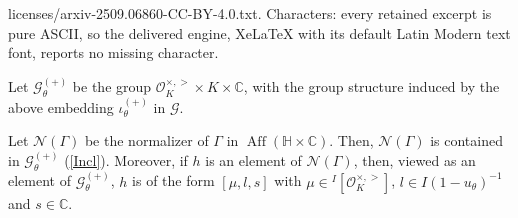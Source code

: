 \documentclass[10pt,a4paper]{amsart}
\DeclareMathOperator{\Aff}{Aff}
\newcommand{\C}{\mathbb{C}}
\newcommand{\HH}{\mathbb{H}}
\newcommand{\Nc}{\mathcal{N}}
\newcommand{\OO}{\mathcal{O}}
\begin{document}
licenses/arxiv-2509.06860-CC-BY-4.0.txt. Characters: every retained excerpt is pure ASCII, so the delivered engine, XeLaTeX with its default Latin Modern text font, reports no missing character.
\begin{definition}\label{Incl}
Let $\mathcal{G}_{\theta}^{(+)}$ be the group $\OO_K^{\times, >} \times K \times \C$, with the group structure induced by the above embedding $\iota_{\theta}^{(+)}$ in $\mathcal{G}$.
\end{definition}

\begin{lemma}\label{norm} 
Let  $\Nc(\Gamma)$ be the normalizer of $\Gamma$ in $\Aff(\HH \times \C)$. Then, $\Nc(\Gamma)$ is contained in $\mathcal{G}^{(+)}_\theta$ (\ref{Incl}). Moreover, if $h$ is an element of $\Nc(\Gamma)$, then, viewed as an element of $\mathcal{G}_{\theta}^{(+)}$, $h$ is of the form $[\mu,l,s]$ with $\mu \in {}^I[\OO_K^{\times, >}]$, $l \in I(1-u_\theta)^{-1}$ and $s \in \C$.
\end{lemma}
\end{document}
